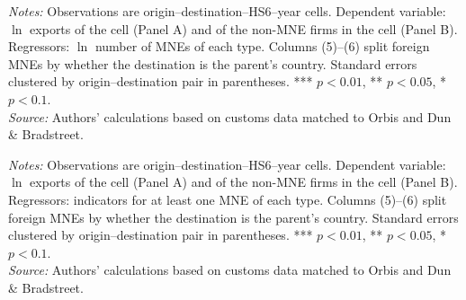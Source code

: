 \documentclass[11pt,a4paper]{article}
\begin{document}
\begin{table}[H]\centering\small%
  \caption{Multinational Presence and Exports: Intensive Margin, by Type of Multinational}%
  \label{tab:cnt_all}%
  \par\vspace{3pt}%
  \begin{minipage}{0.95\textwidth}\footnotesize %
  \textit{Notes:} Observations are origin--destination--HS6--year cells. Dependent variable: $\ln$ exports of the cell (Panel A) and of the non-MNE firms in the cell (Panel B). Regressors: $\ln$ number of MNEs of each type. Columns (5)--(6) split foreign MNEs by whether the destination is the parent's country. Standard errors clustered by origin--destination pair in parentheses. *** $p<0.01$, ** $p<0.05$, * $p<0.1$.\\[3pt]%
  \textit{Source:} Authors' calculations based on customs data matched to Orbis and Dun \& Bradstreet.%
  \end{minipage}%
  \end{table}
\begin{table}[H]\centering\small%
  \caption{Multinational Presence and Exports: Extensive Margin, by Type of Multinational}%
  \label{tab:ext_all}%
  \par\vspace{3pt}%
  \begin{minipage}{0.95\textwidth}\footnotesize %
  \textit{Notes:} Observations are origin--destination--HS6--year cells. Dependent variable: $\ln$ exports of the cell (Panel A) and of the non-MNE firms in the cell (Panel B). Regressors: indicators for at least one MNE of each type. Columns (5)--(6) split foreign MNEs by whether the destination is the parent's country. Standard errors clustered by origin--destination pair in parentheses. *** $p<0.01$, ** $p<0.05$, * $p<0.1$.\\[3pt]%
  \textit{Source:} Authors' calculations based on customs data matched to Orbis and Dun \& Bradstreet.%
  \end{minipage}%
  \end{table}
\end{document}
